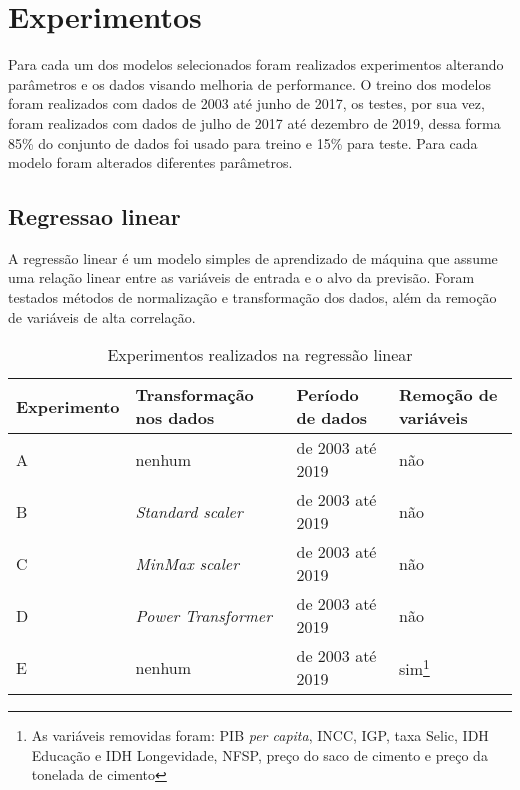 
\chapter{Experimentos}

Para cada um dos modelos selecionados foram realizados experimentos
alterando parâmetros e os dados visando melhoria de performance. O
treino dos modelos foram realizados com dados de 2003 até junho de 
2017, os testes, por sua vez, foram realizados com dados de 
julho de 2017 até dezembro de 2019, dessa forma 85\% do conjunto 
de dados foi usado para treino e 15\% para teste. Para cada modelo foram 
alterados diferentes parâmetros.

\section{Regressao linear}

A regressão linear é um modelo simples de aprendizado de máquina que assume
uma relação linear entre as variáveis de entrada e o alvo da previsão. Foram testados
métodos de normalização e transformação dos dados, além da remoção de variáveis de 
alta correlação. 

\begin{table}
    \centering
    \begin{tabular}{llll}
        \toprule
        Experimento & Transformação nos dados     & Período de dados & Remoção de variáveis  \\
        \midrule
        A           & nenhum & de 2003 até 2019            & não~                                     \\
        B           & \textit{Standard scaler}~            & de 2003 até 2019            & não~ ~                                   \\
        C           & \textit{MinMax scaler}~ ~            & de 2003 até 2019            & não~ ~ ~                                 \\
        D           & \textit{Power Transformer}           & de 2003 até 2019            & não                                      \\
        E           & nenhum & de 2003 até 2019            & sim\footnote{As variáveis removidas foram: PIB \textit{per capita}, INCC, IGP, taxa Selic, IDH Educação e IDH Longevidade, 
        NFSP, preço do saco de cimento e preço da tonelada de cimento}                                      \\
        \bottomrule
    \end{tabular}
    \label{tab:exp-reg-lin}
    \caption{Experimentos realizados na regressão linear}
\end{table}

